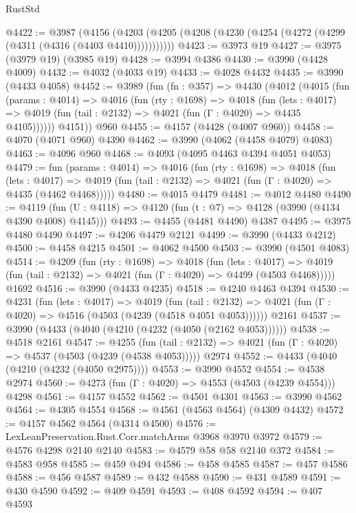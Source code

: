 \begin{lexlean}{RustStd}
\begin{coremodule}
{\begin{coremodule}
{{{{{{{{{{{{{{{{@4422 := @3987
    (@4156 (@4203 (@4205 (@4208 (@4230 (@4254 (@4272 (@4299 (@4311 (@4316 (@4403 @4410)))))))))))
@4423 := @3973 @19
@4427 := @3975 (@3979 @19) (@3985 @19)
@4428 := @3994 @4386
@4430 := @3990 (@4428 @4009)
@4432 := @4032 (@4033 @19)
@4433 := @4028 @4432
@4435 := @3990 (@4433 @4058)
@4452 := @3989
    (fun (fn : @357) =>
    @4430
      (@4012
        (@4015
          (fun (params : @4014) =>
          @4016
            (fun (rty : @1698) =>
            @4018
              (fun (lets : @4017) =>
              @4019 (fun (tail : @2132) => @4021 (fun (Γ : @4020) => @4435 @4105))))))
        @4151))
    @960
@4455 := @4157 (@4428 (@4007 @960))
@4458 := @4070 (@4071 @960) @4390
@4462 := @3990 (@4062 (@4458 @4079) @4083)
@4463 := @4096 @960
@4468 := @4093 (@4095 @4463 @4394 @4051 @4053)
@4479 := fun (params : @4014) =>
  @4016
    (fun (rty : @1698) =>
    @4018
      (fun (lets : @4017) =>
      @4019 (fun (tail : @2132) => @4021 (fun (Γ : @4020) => @4435 (@4462 @4468)))))
@4480 := @4015 @4479
@4481 := @4012 @4480
@4490 := @4119 (fun (U : @4118) => @4120 (fun (t : @7) => @4128 (@3990 (@4134 @4390 @4008) @4145)))
@4493 := @4455 (@4481 @4490) @4387
@4495 := @3975 @4480 @4490
@4497 := @4206 @4479 @2121
@4499 := @3990 (@4433 @4212)
@4500 := @4458 @4215
@4501 := @4062 @4500
@4503 := @3990 (@4501 @4083)
@4514 := @4209
    (fun (rty : @1698) =>
    @4018
      (fun (lets : @4017) =>
      @4019 (fun (tail : @2132) => @4021 (fun (Γ : @4020) => @4499 (@4503 @4468)))))
    @1692
@4516 := @3990 (@4433 @4235)
@4518 := @4240 @4463 @4394
@4530 := @4231
    (fun (lets : @4017) =>
    @4019
      (fun (tail : @2132) => @4021 (fun (Γ : @4020) => @4516 (@4503 (@4239 (@4518 @4051 @4053))))))
    @2161
@4537 := @3990 (@4433 (@4040 (@4210 (@4232 (@4050 (@2162 @4053))))))
@4538 := @4518 @2161
@4547 := @4255
    (fun (tail : @2132) => @4021 (fun (Γ : @4020) => @4537 (@4503 (@4239 (@4538 @4053)))))
    @2974
@4552 := @4433 (@4040 (@4210 (@4232 (@4050 @2975))))
@4553 := @3990 @4552
@4554 := @4538 @2974
@4560 := @4273 (fun (Γ : @4020) => @4553 (@4503 (@4239 @4554))) @4298
@4561 := @4157 @4552
@4562 := @4501 @4301
@4563 := @3990 @4562
@4564 := @4305 @4554
@4568 := @4561 (@4563 @4564) (@4309 @4432)
@4572 := @4157 @4562 @4564 (@4314 @4500)
@4576 := LexLeanPreservation.Rust.Corr.matchArms @3968 @3970 @3972
@4579 := @4576 @4298 @2140 @2140
@4583 := @4579 @58 @58 @2140 @372
@4584 := @4583 @958
@4585 := @459 @494
@4586 := @458 @4585
@4587 := @457 @4586
@4588 := @456 @4587
@4589 := @432 @4588
@4590 := @431 @4589
@4591 := @430 @4590
@4592 := @409 @4591
@4593 := @408 @4592
@4594 := @407 @4593
}}}}}}}}}}}}}}}}
\end{coremodule}}
\end{coremodule}
\end{lexlean}
